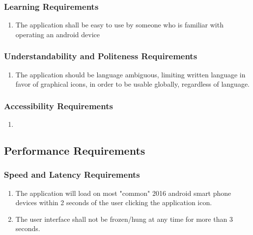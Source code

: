\documentclass[]{article}
\begin{document}
\subsubsection{Learning Requirements}
\label{ssub:learning_requirements}
\begin{enumerate}[{UH}1. ]
	\item The application shall be easy to use by someone who is familiar with operating an android device
\end{enumerate}

\subsubsection{Understandability and Politeness Requirements}
\label{ssub:understandability_and_politeness_requirements}
\begin{enumerate}[{UH}1. ]
	\item The application should be language ambiguous, limiting written language in favor of graphical icons, in order to be usable globally, regardless of language.
\end{enumerate}

\subsubsection{Accessibility Requirements}
\label{ssub:accessibility_requirements}
\begin{enumerate}[{UH}1. ]
	\item 
\end{enumerate}


\subsection{Performance Requirements}
\label{sub:performance_requirements}

\subsubsection{Speed and Latency Requirements}
\label{ssub:speed_and_latency_requirements}
\begin{enumerate}[{PR}1. ]
	\item The application will load on most "common" 2016 android smart phone devices within 2 seconds of the user clicking the application icon.
	\item The user interface shall not be frozen/hung at any time for more than 3 seconds.
\end{enumerate}
\end{document}
